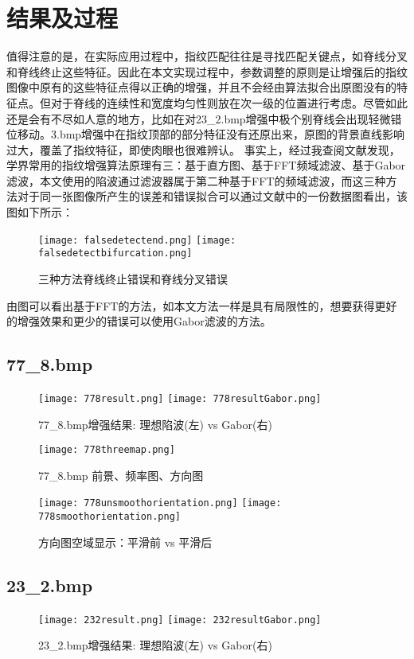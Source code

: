 \documentclass[UTF8]{ctexart}
\begin{document}
\section{结果及过程}
值得注意的是，在实际应用过程中，指纹匹配往往是寻找匹配关键点，如脊线分叉和脊线终止这些特征。因此在本文实现过程中，参数调整的原则是让增强后的指纹图像中原有的这些特征点得以正确的增强，并且不会经由算法拟合出原图没有的特征点。但对于脊线的连续性和宽度均匀性则放在次一级的位置进行考虑。尽管如此还是会有不尽如人意的地方，比如在对23\_2.bmp增强中极个别脊线会出现轻微错位移动。3.bmp增强中在指纹顶部的部分特征没有还原出来，原图的背景直线影响过大，覆盖了指纹特征，即使肉眼也很难辨认。
事实上，经过我查阅文献发现，学界常用的指纹增强算法原理有三：基于直方图、基于FFT频域滤波、基于Gabor滤波，本文使用的陷波通过滤波器属于第二种基于FFT的频域滤波，而这三种方法对于同一张图像所产生的误差和错误拟合可以通过文献\cite{ref2}中的一份数据图看出，该图如下所示：
\begin{figure}[H]
    \centering
    \texttt{[image: falsedetectend.png]}
    \texttt{[image: falsedetectbifurcation.png]}
    \caption{三种方法脊线终止错误和脊线分叉错误}
\end{figure}

由图可以看出基于FFT的方法，如本文方法一样是具有局限性的，想要获得更好的增强效果和更少的错误可以使用Gabor滤波的方法。

\subsection{77\_8.bmp}
\begin{figure}[H]
    \centering
    \texttt{[image: 778result.png]}
    \texttt{[image: 778resultGabor.png]}
    \caption{77\_8.bmp增强结果: 理想陷波(左) vs Gabor(右)}
\end{figure}

\begin{figure}[H]
    \centering
    \texttt{[image: 778threemap.png]}
    \caption{77\_8.bmp 前景、频率图、方向图}
\end{figure}

\begin{figure}[H]
    \centering
    \texttt{[image: 778unsmoothorientation.png]}
    \texttt{[image: 778smoothorientation.png]}
    \caption{方向图空域显示：平滑前 vs 平滑后}
\end{figure}

\subsection{23\_2.bmp}
\begin{figure}[H]
    \centering
    \texttt{[image: 232result.png]}
    \texttt{[image: 232resultGabor.png]}
    \caption{23\_2.bmp增强结果: 理想陷波(左) vs Gabor(右)}
\end{figure}
\end{document}
